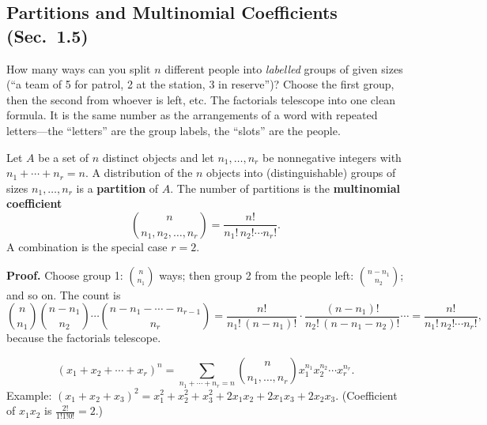 \documentclass[11pt]{article}
\let\oldsubsection\subsection
\renewcommand{\subsection}{\Needspace{14\baselineskip}\oldsubsection}
\begin{document}
\subsection{Partitions and Multinomial Coefficients (Sec.\ 1.5)}

\begin{ideabox}
How many ways can you split $n$ different people into \emph{labelled} groups of given sizes (``a team of 5 for patrol, 2 at the station, 3 in reserve'')? Choose the first group, then the second from whoever is left, etc. The factorials telescope into one clean formula. It is the same number as the arrangements of a word with repeated letters---the ``letters'' are the group labels, the ``slots'' are the people.
\end{ideabox}

\begin{defbox}
Let $A$ be a set of $n$ distinct objects and let $n_1,\dots,n_r$ be nonnegative integers with $n_1+\cdots+n_r=n$. A distribution of the $n$ objects into (distinguishable) groups of sizes $n_1,\dots,n_r$ is a \textbf{partition} of $A$. The number of partitions is the \textbf{multinomial coefficient}
\[ \binom{n}{n_1,n_2,\dots,n_r}=\frac{n!}{n_1!\,n_2!\cdots n_r!}. \]
A combination is the special case $r=2$.
\end{defbox}

\textbf{Proof.} Choose group 1: $\binom n{n_1}$ ways; then group 2 from the people left: $\binom{n-n_1}{n_2}$; and so on. The count is
\[ \binom n{n_1}\binom{n-n_1}{n_2}\cdots\binom{n-n_1-\cdots-n_{r-1}}{n_r}
=\frac{n!}{n_1!\,(n-n_1)!}\cdot\frac{(n-n_1)!}{n_2!\,(n-n_1-n_2)!}\cdots=\frac{n!}{n_1!\,n_2!\cdots n_r!}, \]
because the factorials telescope.

\begin{thmbox}
\[ (x_1+x_2+\cdots+x_r)^n=\sum_{n_1+\cdots+n_r=n}\binom{n}{n_1,\dots,n_r}x_1^{n_1}x_2^{n_2}\cdots x_r^{n_r}. \]
Example: $(x_1+x_2+x_3)^2=x_1^2+x_2^2+x_3^2+2x_1x_2+2x_1x_3+2x_2x_3$. (Coefficient of $x_1x_2$ is $\frac{2!}{1!1!0!}=2$.)
\end{thmbox}
\end{document}
